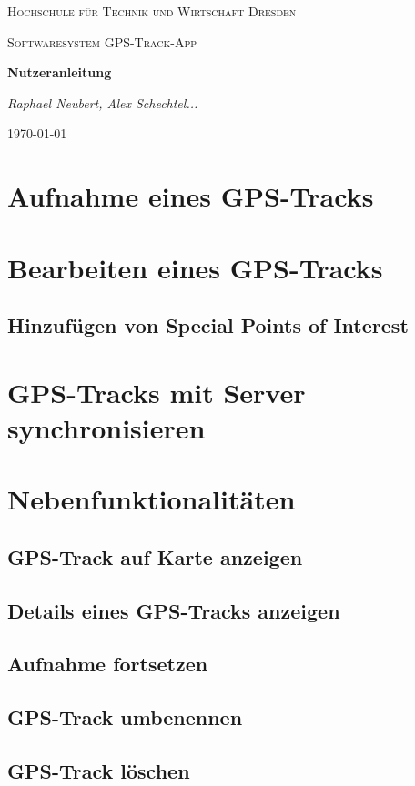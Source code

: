\documentclass{article}
\begin{document}
\begin{titlepage}
    \centering
    {\scshape\LARGE Hochschule für Technik und Wirtschaft Dresden \par}
    \vspace{1cm}
    {\scshape\Large Softwaresystem \glqq GPS-Track-App\grqq\par}
    \vspace{1.5cm}
    {\huge\bfseries Nutzeranleitung\par}
    \vspace{2cm}
    {\Large\itshape Raphael Neubert, Alex Schechtel... \par}
    \vfill

    {\large \today\par}
\end{titlepage}

\tableofcontents
\newpage

\section{Aufnahme eines GPS-Tracks}
\section{Bearbeiten eines GPS-Tracks}
\subsection{Hinzufügen von Special Points of Interest}
\section{GPS-Tracks mit Server synchronisieren}
\section{Nebenfunktionalitäten}
\subsection{GPS-Track auf Karte anzeigen}
\subsection{Details eines GPS-Tracks anzeigen}
\subsection{Aufnahme fortsetzen}
\subsection{GPS-Track umbenennen}
\subsection{GPS-Track löschen}
\end{document}
